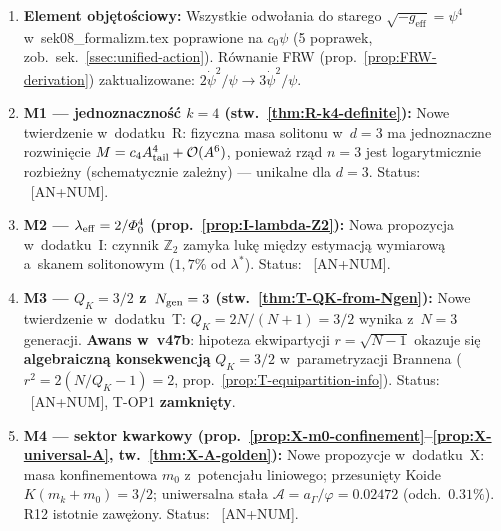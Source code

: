 \begin{remark}\label{rem:status-v47}
\begin{enumerate}[nosep]
  \item \textbf{Element obj\k{e}to\'sciowy:}
    Wszystkie odwo\l{}ania do starego
    $\sqrt{-g_{\mathrm{eff}}} = \psi^4$ w~sek08\_formalizm.tex
    poprawione na $c_0\psi$
    (5 poprawek, zob.\ sek.~\ref{ssec:unified-action}).
    R\'ownanie FRW (prop.~\ref{prop:FRW-derivation})
    zaktualizowane: $2\dot\psi^2/\psi \to 3\dot\psi^2/\psi$.

  \item \textbf{M1 --- jednoznaczno\'s\'c $k = 4$ (stw.~\ref{thm:R-k4-definite}):}
    Nowe twierdzenie w~dodatku~R:
    fizyczna masa solitonu w~$d = 3$ ma jednoznaczne
    rozwini\k{e}cie $M = c_4 A_{\rm tail}^4 + \mathcal{O}(A^6)$,
    poniewa\.z rz\k{a}d $n = 3$ jest logarytmicznie rozbie\.zny
    (schematycznie zale\.zny) --- unikalne dla $d = 3$.
    Status: ~[AN+NUM].

  \item \textbf{M2 --- $\lambda_{\mathrm{eff}} = 2/\varPhi_0^4$
    (prop.~\ref{prop:I-lambda-Z2}):}
    Nowa propozycja w~dodatku~I: czynnik $\mathbb{Z}_2$
    zamyka luk\k{e} mi\k{e}dzy estymacj\k{a} wymiarow\k{a}
    a~skanem solitonowym ($1{,}7\%$ od $\lambda^*$).
    Status: ~[AN+NUM].

  \item \textbf{M3 --- $Q_K = 3/2$ z~$N_{\rm gen} = 3$
    (stw.~\ref{thm:T-QK-from-Ngen}):}
    Nowe twierdzenie w~dodatku~T:
    $Q_K = 2N/(N+1) = 3/2$ wynika z~$N = 3$ generacji.
    \textbf{Awans w~v47b}: hipoteza ekwipartycji
    $r = \sqrt{N{-}1}$ okazuje si\k{e} \textbf{algebraiczn\k{a}
    konsekwencj\k{a}} $Q_K = 3/2$ w~parametryzacji Brannena
    ($r^2 = 2(N/Q_K - 1) = 2$,
    prop.~\ref{prop:T-equipartition-info}).
    Status: ~[AN+NUM],
    T-OP1 \textbf{zamkni\k{e}ty}.

  \item \textbf{M4 --- sektor kwarkowy
    (prop.~\ref{prop:X-m0-confinement}--\ref{prop:X-universal-A},
    tw.~\ref{thm:X-A-golden}):}
    Nowe propozycje w~dodatku~X:
    masa konfinementowa $m_0$ z~potencja\l{}u liniowego;
    przesuni\k{e}ty Koide $K(m_k + m_0) = 3/2$;
    uniwersalna sta\l{}a $\mathcal{A} = a_\Gamma/\varphi = 0.02472$
    (odch.\ $0.31\%$). R12 istotnie zaw\k{e}\.zony.
    Status: ~[AN+NUM].


\end{enumerate}
\end{remark}
